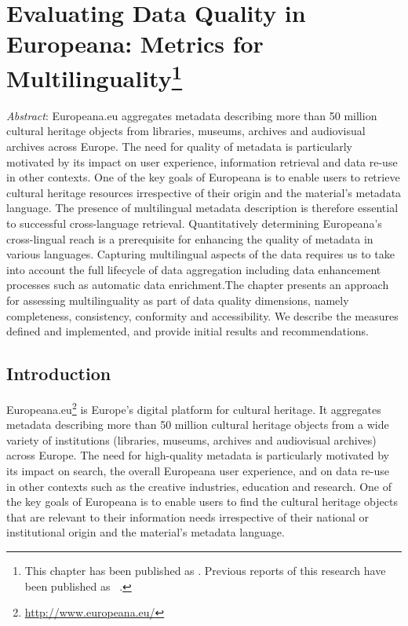 \chapter[Evaluating Data Quality in Europeana: Metrics for Multilinguality]{Evaluating Data Quality in Europeana: Metrics for Multilinguality\footnote{This chapter has been published as \cite{kiraly-et-al2018}. Previous reports of this research have been published as ~\cite{stiller-kiraly2017, charles2017}.}}

\emph{Abstract}: Europeana.eu aggregates metadata describing more than 50 million cultural heritage objects from libraries, museums, archives and audiovisual archives across Europe. The need for quality of metadata is particularly motivated by its impact on user experience, information retrieval and data re-use in other contexts. One of the key goals of Europeana is to enable users to retrieve cultural heritage resources irrespective of their origin and the material's metadata language. The presence of multilingual metadata description is therefore essential to successful cross-language retrieval. Quantitatively determining Europeana's cross-lingual reach is a prerequisite for enhancing the quality of metadata in various languages.
% 
% 
Capturing multilingual aspects of the data requires us to take into account the full lifecycle of data aggregation including data enhancement processes such as automatic data enrichment.The chapter presents an approach for assessing multilinguality as part of data quality dimensions, namely completeness, consistency, conformity and accessibility. We describe the measures defined and implemented, and provide initial results and recommendations. 


%
\section{Introduction}
Europeana.eu\footnote{\url{http://www.europeana.eu/}} is Europe's digital platform for cultural heritage. It aggregates metadata describing more than 50 million cultural heritage objects from a wide variety of institutions (libraries, museums, archives and audiovisual archives) across Europe. 
The need for high-quality metadata is particularly motivated by its impact on search, the overall Europeana user experience, and on data re-use in other contexts such as the creative industries, education and research. One of the key goals of Europeana is to enable users to find the cultural heritage objects that are relevant to their information needs irrespective of their national or institutional origin and the material's metadata language. 

